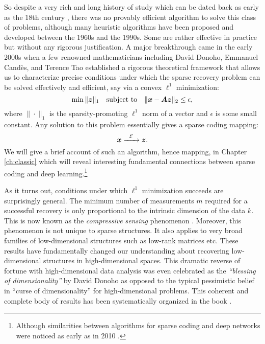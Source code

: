 \documentclass[\toplevelprefix/book-main.tex]{subfiles}
\begin{document}
So despite a very rich and long history of study which can be dated back as early as  the 18th century \cite{Boscovichca1750}, there was no provably efficient algorithm to solve this class of problems, although many heuristic algorithms have been proposed and developed between the 1960s and the 1990s. Some are rather effective in practice but without any rigorous justification. A major breakthrough came in the early 2000s when a few renowned mathematicians including David Donoho, Emmanuel Cand\`{e}s, and Terence Tao \cite{donoho2005neighborly,Candes2005,CandesE2005-IT} established a rigorous theoretical framework that allows us to characterize  precise conditions under which the sparse recovery problem can be solved effectively and efficient, say via a convex $\ell^1$ minimization:
\begin{equation}
    \min \|\bm{z}\|_1 \quad \mbox{subject to} \quad \| \bm{x} - \boldsymbol{A}\bm{z}\|_2 \le \epsilon,
\end{equation}
where $\|\cdot \|_1$ is the sparsity-promoting $\ell^1$ norm of a vector and $\epsilon$ is some small constant. Any solution to this problem essentially gives a sparse coding mapping:
\begin{equation}
    \bm{x}   \xrightarrow{\hspace{2mm} \mathcal{E} \hspace{2mm}}  \bm{z}.
       \label{eqn:decoding-sparse}
\end{equation}
We will give a brief account of such an algorithm, hence mapping, in Chapter \ref{ch:classic} which will reveal interesting fundamental connections between sparse coding and deep learning.\footnote{Although similarities between algorithms for sparse coding and deep networks were noticed as early as in 2010 \cite{gregor2010learning}.}

As it turns out, conditions under which $\ell^1$ minimization succeeds are surprisingly general. The minimum number of measurements $m$ required for a successful recovery is only proportional to the intrinsic dimension of the data $k$. This is now known as the {\em compressive sensing} phenomenon \cite{CandesE2006-ICM}. Moreover, this phenomenon is not unique to sparse structures. It also applies to very broad families of low-dimensional structures such as low-rank matrices etc. These results have fundamentally changed our understanding about recovering low-dimensional structures in high-dimensional spaces. This dramatic reverse of fortune with high-dimensional data analysis was even celebrated as the {\em ``blessing of dimensionality''} by David Donoho \cite{DonohoD2000} as opposed to the typical pessimistic belief in  ``curse of dimensionality'' for high-dimensional problems. This coherent and complete body of results has  been systematically organized in the book \cite{Wright-Ma-2022}. 
\end{document}
